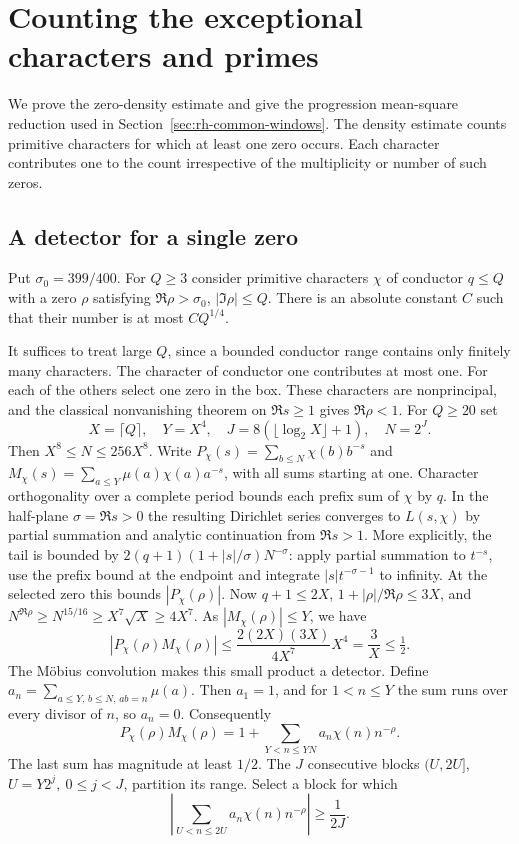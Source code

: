 \section{Counting the exceptional characters and primes}
\label{sec:window-exceptions}

We prove the zero-density estimate and give the progression mean-square
reduction used in Section~\ref{sec:rh-common-windows}. The density
estimate counts primitive characters for which at least one zero
occurs. Each character contributes one to the count irrespective of
the multiplicity or number of such zeros.

\subsection{A detector for a single zero}

Put \(\sigma_0=399/400\). For \(Q\ge3\) consider primitive
characters \(\chi\) of conductor \(q\le Q\) with a zero \(\rho\)
satisfying \(\Re\rho>\sigma_0\), \(|\Im\rho|\le Q\).
There is an absolute constant \(C\) such that their number is at
most \(CQ^{1/4}\).

It suffices to treat large \(Q\), since a bounded conductor range
contains only finitely many characters. The character of conductor
one contributes at most one. For each of the others select one zero
in the box. These characters are nonprincipal, and the classical
nonvanishing theorem on \(\Re s\ge1\) gives \(\Re\rho<1\).
For \(Q\ge20\) set
\[
 X=\lceil Q\rceil,\quad Y=X^4,\quad
 J=8(\lfloor\log_2 X\rfloor+1),\quad N=2^J .
\]
Then \(X^8\le N\le256X^8\). Write \(P_\chi(s)=
\sum_{b\le N}\chi(b)b^{-s}\) and \(M_\chi(s)=
\sum_{a\le Y}\mu(a)\chi(a)a^{-s}\), with all sums starting at one.
Character orthogonality over a complete period bounds each prefix
sum of \(\chi\) by \(q\). In the half-plane \(\sigma=\Re s>0\)
the resulting Dirichlet series converges to \(L(s,\chi)\) by partial
summation and analytic continuation from \(\Re s>1\). More explicitly,
the tail is bounded by \(2(q+1)(1+|s|/\sigma)N^{-\sigma}\):
apply partial summation to \(t^{-s}\), use the prefix bound at the
endpoint and integrate \(|s|t^{-\sigma-1}\) to infinity.
At the selected zero this bounds \(|P_\chi(\rho)|\).
Now \(q+1\le2X\), \(1+|\rho|/\Re\rho\le3X\), and
\(N^{\Re\rho}\ge N^{15/16}\ge X^7\sqrt X\ge4X^7\).
As \(|M_\chi(\rho)|\le Y\), we have
\[
     |P_\chi(\rho)M_\chi(\rho)|
       \le\frac{2(2X)(3X)}{4X^7}X^4=\frac{3}{X}\le\tfrac12.
\]
The Möbius convolution makes this small product a detector. Define
\(a_n=\sum_{a\le Y,\,b\le N,\,ab=n}\mu(a)\).
Then \(a_1=1\), and for \(1<n\le Y\) the sum runs over every
divisor of \(n\), so \(a_n=0\). Consequently
\[
 P_\chi(\rho)M_\chi(\rho)=
     1+\sum_{Y<n\le YN}a_n\chi(n)n^{-\rho}.
\]
The last sum has magnitude at least \(1/2\). The \(J\) consecutive
blocks \((U,2U]\), \(U=Y2^j,\ 0\le j<J\), partition its range.
Select a block for which
\[
 \left|\sum_{U<n\le2U}a_n\chi(n)n^{-\rho}\right|
              \ge\frac{1}{2J}.
\]


